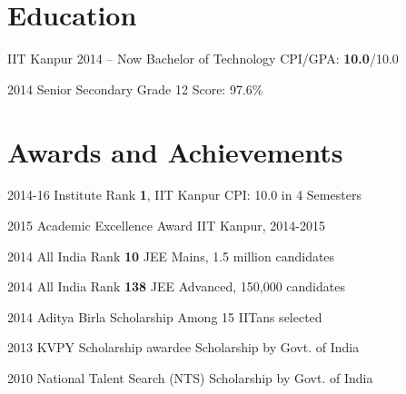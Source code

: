 \documentclass{tccv}
\begin{document}
\section{Education}

\begin{yearlist}

\item[IIT Kanpur]{\small{2014 -- Now}}
  {Bachelor of Technology}
  {CPI/GPA: \textbf{10.0}/10.0}

\item[]{\small{2014}}
  {Senior Secondary Grade 12}
  {Score: 97.6\%}

\end{yearlist}

\vspace{-0.7cm}
\section{Awards and Achievements}

\begin{yearlist}

\item{\small{2014-16}}
  {Institute Rank \textbf{1}, IIT Kanpur}
  {\small{CPI: 10.0 in 4 Semesters}}

\item{\small{2015}}
  {Academic Excellence Award}
  {\small{IIT Kanpur, 2014-2015}}

\item{\small{2014}}
  {All India Rank \textbf{10}}
  {\small{JEE Mains, 1.5 million candidates}}

\item {\small{2014}}
  {All India Rank \textbf{138}}
  {\small{JEE Advanced, 150,000 candidates}}

\item {\small{2014}}
  {Aditya Birla Scholarship}
  {\small{Among 15 IITans selected}}

\item {\small{2013}}
  {KVPY Scholarship awardee}
  {\small{Scholarship by Govt. of India}}

\item {\small{2010}}
  {National Talent Search (NTS)}
  {\small{Scholarship by Govt. of India}}

\end{yearlist}

\vspace{-0.6cm}
\end{document}
